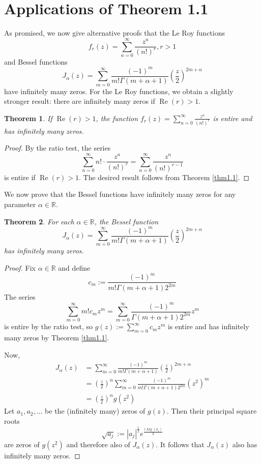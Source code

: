 \documentclass[12pt,a4paper,reqno]{amsart}
\numberwithin{equation}{section}
\theoremstyle{plain}
\newtheorem{theorem}{Theorem}[section]
\theoremstyle{definition}
\newcommand\R{\mathbb{R}}
\newcommand{\on}{\operatorname}
\begin{document}
    \section{Applications of Theorem 1.1}\label{sec3}
   As promised, we now give alternative proofs that the Le Roy functions
   $$f_r(z)=\sum_{n=0}^\infty \frac{z^n}{(n!)^r}, r>1$$
   and Bessel functions
   $$J_\alpha(z)=\sum_{m=0}^\infty \frac{(-1)^m}{m!\Gamma(m+\alpha+1)}\left(\frac{z}{2}\right)^{2m+\alpha}$$
   have infinitely many zeros.
   For the Le Roy functions, we obtain a slightly stronger result: there are infinitely many zeros if $\on{Re}(r)>1$.
    \begin{theorem}
        If $\on{Re}(r)>1$, the function $f_r(z)=\sum_{n=0}^\infty \frac{z^n}{(n!)^r}$ is entire and has infinitely many zeros.
    \end{theorem}
    \begin{proof}
        By the ratio test, the series
        $$\sum_{n=0}^\infty n!\cdot \frac{z^n}{(n!)^r}=\sum_{n=0}^\infty \frac{z^n}{(n!)^{r-1}}$$
        is entire if $\on{Re}(r)>1$. The desired result follows from Theorem \ref{thm1.1}.
    \end{proof}
    We now prove that the Bessel functions have infinitely many zeros for any parameter $\alpha\in\R$.
    \begin{theorem}
        For each $\alpha\in\R$, the Bessel function
        $$J_\alpha(z)=\sum_{m=0}^\infty \frac{(-1)^m}{m!\Gamma(m+\alpha+1)}\left(\frac{z}{2}\right)^{2m+\alpha}$$
        has infinitely many zeros.
    \end{theorem}
    \begin{proof}
        Fix $\alpha\in\R$ and define
        $$c_m:=\frac{(-1)^m}{m!\Gamma(m+\alpha+1)2^{2m}}$$
        The series
        $$\sum_{m=0}^\infty m!c_m z^m=\sum_{m=0}^\infty \frac{(-1)^m}{\Gamma(m+\alpha+1)2^{2m}}z^m$$
        is entire by the ratio test, so $g(z):=\sum_{m=0}^\infty c_m z^m$ is entire and has infinitely many zeros by Theorem \ref{thm1.1}.
    
        Now,
        \begin{align*}
            J_\alpha(z) &= \sum_{m=0}^\infty \frac{(-1)^m}{m!\Gamma(m+\alpha+1)}\left(\frac{z}{2}\right)^{2m+\alpha}\\
            &= \left(\frac{z}{2}\right)^\alpha\sum_{m=0}^\infty \frac{(-1)^m}{m!\Gamma(m+\alpha+1)2^{2m}}(z^2)^m\\
            &= \left(\frac{z}{2}\right)^\alpha g(z^2)
        \end{align*}
        Let $a_1,a_2,\dots$ be the (infinitely many) zeros of $g(z)$. Then their principal square roots
        $$\sqrt{a_j}:=|a_j|^{\frac{1}{2}}e^{\frac{i\operatorname{Arg}(a_i)}{2}}$$
        are zeros of $g(z^2)$ and therefore also of $J_\alpha (z)$. It follows that $J_\alpha(z)$ also has infinitely many zeros.
    \end{proof}
    
	
	
	
	
\end{document}
